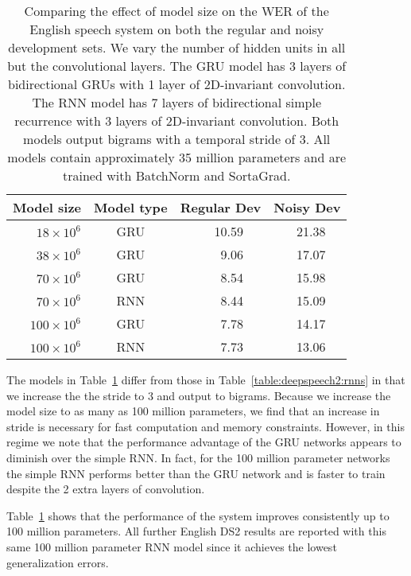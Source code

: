 \begin{table}
\centering
\begin{tabular}{r  c  r r r  r r r}
\toprule
Model size & Model type & \multicolumn{3}{c}{Regular Dev} & \multicolumn{3}{c}{Noisy Dev} \\
\midrule
$18  \times 10^6$    & GRU &   & 10.59 & &  & 21.38 & \\
$38  \times 10^6$    & GRU &   & 9.06  & &  & 17.07 & \\
$70  \times 10^6$    & GRU &   & 8.54  & &  & 15.98 & \\
$70  \times 10^6$    & RNN &   & 8.44  & &  & 15.09 & \\
$100 \times 10^6$    & GRU &   & 7.78  & &  & 14.17 & \\
$100 \times 10^6$    & RNN &   & 7.73  & &  & 13.06 & \\
\bottomrule
\end{tabular}
\caption{Comparing the effect of model size on the WER of the English speech
    system on both the regular and noisy development sets. We vary the number
    of hidden units in all but the convolutional layers. The GRU model has 3
    layers of bidirectional GRUs with 1 layer of 2D-invariant convolution. The
    RNN model has 7 layers of bidirectional simple recurrence with 3 layers of
    2D-invariant convolution. Both models output bigrams with a temporal stride
    of 3. All models contain approximately 35 million parameters and are
    trained with BatchNorm and SortaGrad.}
\label{table:deepspeech2:modelsize}
\end{table}

The models in Table~\ref{table:deepspeech2:modelsize} differ from those in
Table~\ref{table:deepspeech2:rnns} in that we increase the the stride to 3 and
output to bigrams. Because we increase the model size to as many as 100 million
parameters, we find that an increase in stride is necessary for fast
computation and memory constraints. However, in this regime we note that the
performance advantage of the GRU networks appears to diminish over the simple
RNN. In fact, for the 100 million parameter networks the simple RNN performs
better than the GRU network and is faster to train despite the 2 extra layers
of convolution.

Table~\ref{table:deepspeech2:modelsize} shows that the performance of the
system improves consistently up to 100 million parameters. All further English
DS2 results are reported with this same 100 million parameter RNN model since
it achieves the lowest generalization errors.

